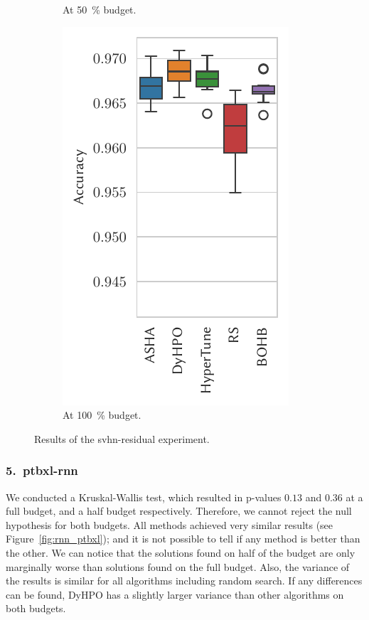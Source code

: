 \begin{figure}[H]
\begin{subfigure}{.26\textwidth}
        \caption{At \SI{50}{\percent} budget.}%
    \end{subfigure}%
    \begin{subfigure}{.26\textwidth}
        \includegraphics[height=\plotheight]{img/real_exp/svhn_residual_boxplot_full.pdf}%
        \caption{At \SI{100}{\percent} budget.}%
    \end{subfigure}%
\caption{Results of the svhn-residual experiment.}
\label{fig:resnet_svhn}
\end{figure}


\subsubsection{5.\ ptbxl-rnn}
We conducted a Kruskal-Wallis test, which resulted in p-values $0.13$ and $0.36$ at a full budget, and a half budget respectively. Therefore, we cannot reject the null hypothesis for both budgets. All methods achieved very similar results (see Figure~\ref{fig:rnn_ptbxl}); and it is not possible to tell if any method is better than the other. We can notice that the solutions found on half of the budget are only marginally worse than solutions found on the full budget. Also, the variance of the results is similar for all algorithms including random search. If any differences can be found, DyHPO has a slightly larger variance than other algorithms on both budgets.

